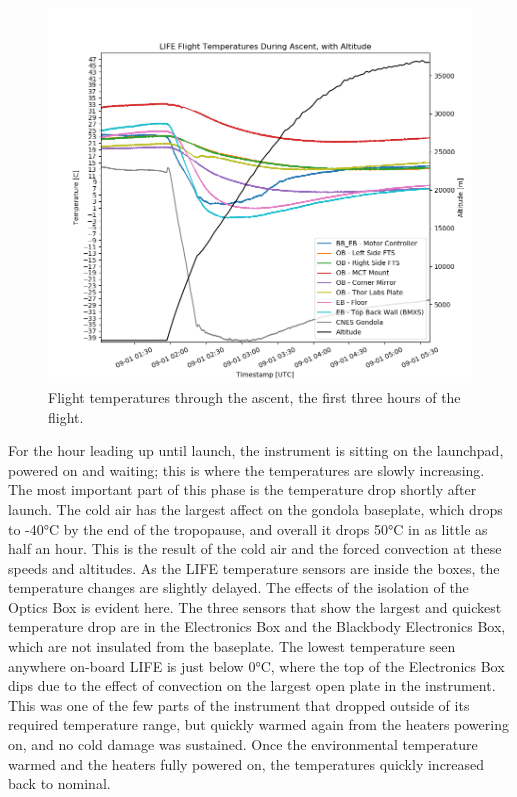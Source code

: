 \begin{figure}
    \centering
    \includegraphics[width=\textwidth]{chap4_images/ascent_images/Ascent_temps_no_sims_V2.png}
    \caption{Flight temperatures through the ascent, the first three hours of the flight.}
    \label{fig:ascent_temps_no_sims}
\end{figure}

For the hour leading up until launch, the instrument is sitting on the launchpad, powered on and waiting; this is where the temperatures are slowly increasing. The most important part of this phase is the temperature drop shortly after launch. The cold air has the largest affect on the gondola baseplate, which drops to -40°C by the end of the tropopause, and overall it drops 50°C in as little as half an hour. This is the result of the cold air and the forced convection at these speeds and altitudes. As the LIFE temperature sensors are inside the boxes, the temperature changes are slightly delayed. The effects of the isolation of the Optics Box is evident here. The three sensors that show the largest and quickest temperature drop are in the Electronics Box and the Blackbody Electronics Box, which are not insulated from the baseplate. The lowest temperature seen anywhere on-board LIFE is just below 0°C, where the top of the Electronics Box dips due to the effect of convection on the largest open plate in the instrument. This was one of the few parts of the instrument that dropped outside of its required temperature range, but quickly warmed again from the heaters powering on, and no cold damage was sustained. Once the environmental temperature warmed and the heaters fully powered on, the temperatures quickly increased back to nominal.

